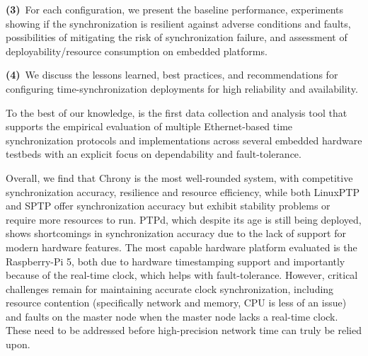 \textbf{(3)}~For each configuration,
we present the baseline performance, %
experiments showing if the synchronization is resilient against adverse
conditions and faults,
possibilities of mitigating the risk of synchronization failure,
and assessment of deployability/resource consumption on embedded platforms.

\textbf{(4)}~We discuss the lessons learned, best practices, and recommendations
for configuring time-synchronization deployments for high reliability and availability.


To the best of our knowledge, \toolName{} is the first data collection and
analysis tool %
that supports the empirical evaluation of multiple Ethernet-based time
synchronization protocols and implementations across several embedded hardware
testbeds with an explicit focus on dependability and fault-tolerance.

Overall, we find that Chrony is the most well-rounded system, with competitive
synchronization accuracy, resilience and resource efficiency, while both
LinuxPTP and SPTP offer synchronization accuracy but exhibit stability problems
or require more resources to run. PTPd, which despite its age is still being
deployed, shows shortcomings in synchronization accuracy due to the lack of
support for modern hardware features. The most capable hardware platform
evaluated is the Raspberry-Pi 5, both due to hardware timestamping support and
importantly because of the real-time clock, which helps with fault-tolerance.
However, critical challenges remain for maintaining accurate clock synchronization,
including resource contention (specifically network and memory, CPU is less of an
issue) and faults on the master node when the master node lacks a real-time
clock. These need to be addressed before
high-precision network time can truly be relied upon.



